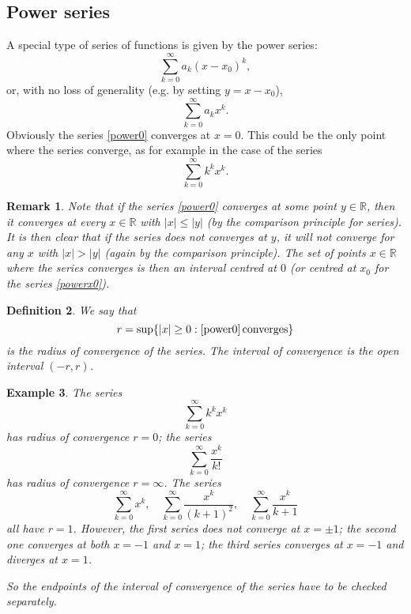 \documentclass[a4paper,reqno]{amsart}
\numberwithin{equation}{section}
\newtheorem{definition}{Definition}[section]
\newtheorem{remark}[definition]{Remark}
\newtheorem{example}[definition]{Example}
\def\R{\mathbb{R}}
\begin{document}
\subsection{Power series}
A special type of series of functions is given by the power series:
\begin{equation}\label{powerx0}
\sum_{k=0}^\infty a_k(x-x_0)^k,
\end{equation}%
or, with no loss of generality (e.g. by setting $y=x-x_0$),
\begin{equation}\label{power0}
\sum_{k=0}^\infty a_k x^k.
\end{equation}
Obviously the series \eqref{power0} converges at $x=0$. This could be the only point where the series converge, as for example in the case of the series
$$
\sum_{k=0}^\infty k^k x^k.
$$

\begin{remark}
Note that if the series \eqref{power0} converges at some point $y\in \R$, then it converges at every $x\in \R$ with $|x|\leq |y|$ (by the comparison principle for series). It is then clear that if the series does not converges at $y$, 
it will not converge for any $x$ with $|x|>|y|$ (again by the comparison principle). The set of points $x\in \R$ where the series converges is then an 
interval centred at $0$ (or centred at $x_0$ for the series \eqref{powerx0}).
\end{remark}

\begin{definition}
We say that 
$$
r = \sup \{|x|\geq 0: \eqref{power0} \, \textrm{converges}\}
$$
is the radius of convergence of the series. The interval of convergence is the open interval $(-r,r)$.
\end{definition}

\begin{example}
The series 
$$
\sum_{k=0}^\infty k^k x^k
$$
has radius of convergence $r=0$; the series 
$$
\sum_{k=0}^\infty \frac{x^k}{k!}
$$
has radius of convergence $r=\infty$.
The series 
$$
\sum_{k=0}^\infty  x^k, \quad \sum_{k=0}^\infty  \frac{x^k}{(k+1)^2}, \quad \sum_{k=0}^\infty  \frac{x^k}{k+1}
$$
all have $r=1$. However, the first series does not converge at $x=\pm1$; the second one converges at both $x=-1$ and $x=1$; the third series converges at $x=-1$ and diverges at $x=1$. 

So the endpoints of the interval of convergence of the series have to be checked separately.
\end{example}
\end{document}
